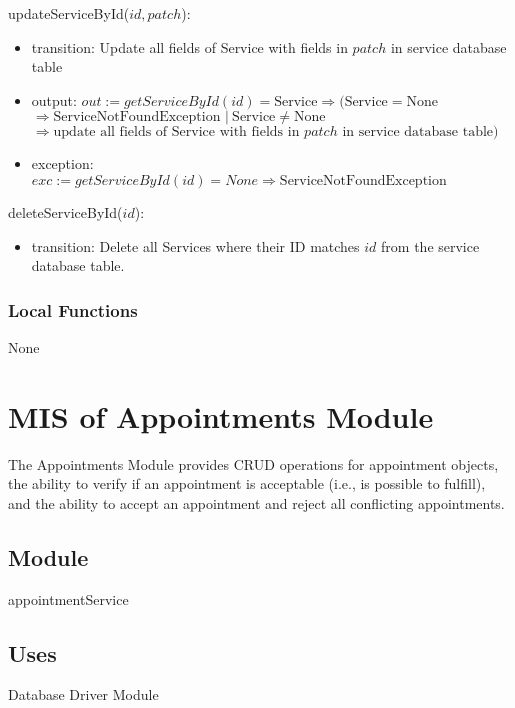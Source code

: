 \documentclass[12pt, titlepage]{article}
\begin{document}
\noindent updateServiceById($id, patch$):
\begin{itemize}
	\item transition: Update all fields of Service with fields in $patch$ in service database table
	\item output: $out := getServiceById(id) = \text{Service} \Rightarrow (\text{Service} = \text{None} $ \\
		      $\Rightarrow \text{ServiceNotFoundException } |\ \text{Service} \neq \text{None}$ \\ $\Rightarrow
		      \text{update all fields of Service with fields in } patch \text{ in service database table})$
	\item exception: $exc := getServiceById(id) = None \Rightarrow \text{ServiceNotFoundException}$
\end{itemize}

\noindent deleteServiceById($id$):
\begin{itemize}
	\item transition: Delete all Services where their ID matches $id$ from the service database table.
\end{itemize}

\subsubsection{Local Functions}

None

\newpage

\section{MIS of Appointments Module} \label{mAppointments}

The Appointments Module provides CRUD operations for appointment objects, the ability to verify if
an appointment is acceptable (i.e., is possible to fulfill), and the ability to accept an
appointment and reject all conflicting appointments.

\subsection{Module}

appointmentService

\subsection{Uses}

Database Driver Module
\end{document}

